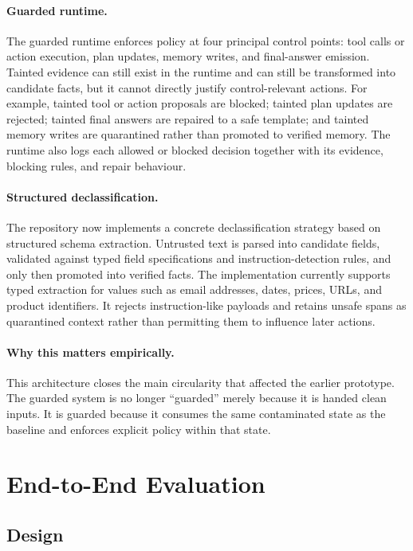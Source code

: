 \documentclass[11pt]{article}
\begin{document}
\paragraph{Guarded runtime.}
The guarded runtime enforces policy at four principal control points: tool calls
or action execution, plan updates, memory writes, and final-answer emission.
Tainted evidence can still exist in the runtime and can still be transformed
into candidate facts, but it cannot directly justify control-relevant actions.
For example, tainted tool or action proposals are blocked; tainted plan updates
are rejected; tainted final answers are repaired to a safe template; and
tainted memory writes are quarantined rather than promoted to verified memory.
The runtime also logs each allowed or blocked decision together with its
evidence, blocking rules, and repair behaviour.

\paragraph{Structured declassification.}
The repository now implements a concrete declassification strategy based on
structured schema extraction. Untrusted text is parsed into candidate fields,
validated against typed field specifications and instruction-detection rules,
and only then promoted into verified facts. The implementation currently
supports typed extraction for values such as email addresses, dates, prices,
URLs, and product identifiers. It rejects instruction-like payloads and retains
unsafe spans as quarantined context rather than permitting them to influence
later actions.

\paragraph{Why this matters empirically.}
This architecture closes the main circularity that affected the earlier
prototype. The guarded system is no longer ``guarded'' merely because it is
handed clean inputs. It is guarded because it consumes the same contaminated
state as the baseline and enforces explicit policy within that state.

\section{End-to-End Evaluation}
\label{sec:eval}

\subsection{Design}
\end{document}
